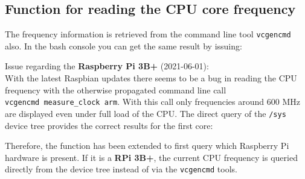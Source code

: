 \documentclass [oneside,10pt,a4paper,ngerman,BCOR10mm,headsepline,parindent,final]{scrartcl}
\newenvironment{Shaded}{}{}
\newcommand{\FunctionTok}[1]{\textcolor[rgb]{0.02,0.16,0.49}{{#1}}}
\newcommand{\NormalTok}[1]{{#1}}
\newcommand{\ExtensionTok}[1]{{#1}}
\begin{document}
    \hypertarget{function-for-reading-the-cpu-core-frequency}{%
\subsection{Function for reading the CPU core
frequency}\label{function-for-reading-the-cpu-core-frequency}}

The frequency information is retrieved from the command line tool
\texttt{vcgencmd} also. In the bash console you can get the same result
by issuing:

\begin{Shaded}
\end{Shaded}

Issue regarding the \textbf{Raspberry Pi 3B+} (2021-06-01):\\
With the latest Raspbian updates there seems to be a bug in reading the
CPU frequency with the otherwise propagated command line call
\texttt{vcgencmd\ measure\_clock\ arm}. With this call only frequencies
around 600 MHz are displayed even under full load of the CPU. The direct
query of the \texttt{/sys} device tree provides the correct results for
the first core:

\begin{Shaded}
\end{Shaded}

Therefore, the function has been extended to first query which Raspberry
Pi hardware is present. If it is a \textbf{RPi 3B+}, the current CPU
frequency is queried directly from the device tree instead of via the
\texttt{vcgencmd} tools.
\end{document}
